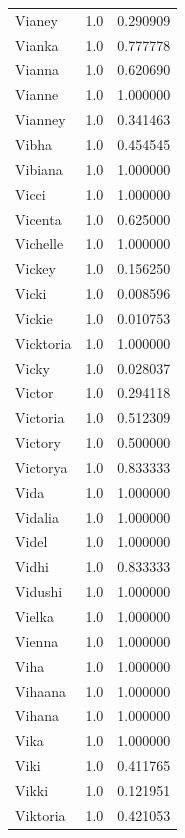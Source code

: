 \documentclass[
  letterpaper,
  DIV=11,
  numbers=noendperiod]{scrreprt}
\begin{document}
\begin{tabular}{lrr}
Vianey          &   1.0 &   0.290909 \\
Vianka          &   1.0 &   0.777778 \\
Vianna          &   1.0 &   0.620690 \\
Vianne          &   1.0 &   1.000000 \\
Vianney         &   1.0 &   0.341463 \\
Vibha           &   1.0 &   0.454545 \\
Vibiana         &   1.0 &   1.000000 \\
Vicci           &   1.0 &   1.000000 \\
Vicenta         &   1.0 &   0.625000 \\
Vichelle        &   1.0 &   1.000000 \\
Vickey          &   1.0 &   0.156250 \\
Vicki           &   1.0 &   0.008596 \\
Vickie          &   1.0 &   0.010753 \\
Vicktoria       &   1.0 &   1.000000 \\
Vicky           &   1.0 &   0.028037 \\
Victor          &   1.0 &   0.294118 \\
Victoria        &   1.0 &   0.512309 \\
Victory         &   1.0 &   0.500000 \\
Victorya        &   1.0 &   0.833333 \\
Vida            &   1.0 &   1.000000 \\
Vidalia         &   1.0 &   1.000000 \\
Videl           &   1.0 &   1.000000 \\
Vidhi           &   1.0 &   0.833333 \\
Vidushi         &   1.0 &   1.000000 \\
Vielka          &   1.0 &   1.000000 \\
Vienna          &   1.0 &   1.000000 \\
Viha            &   1.0 &   1.000000 \\
Vihaana         &   1.0 &   1.000000 \\
Vihana          &   1.0 &   1.000000 \\
Vika            &   1.0 &   1.000000 \\
Viki            &   1.0 &   0.411765 \\
Vikki           &   1.0 &   0.121951 \\
Viktoria        &   1.0 &   0.421053 \\

\end{tabular}
\end{document}
